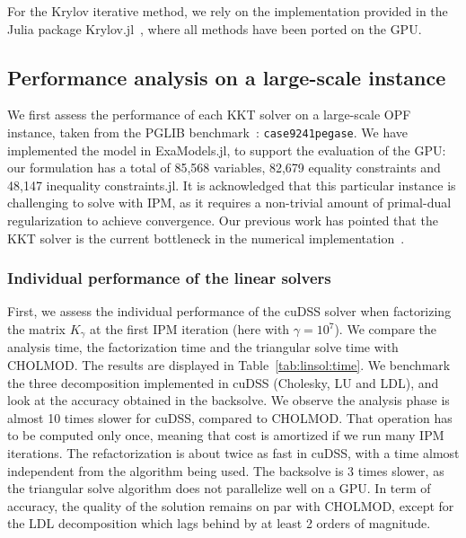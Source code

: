 For the Krylov iterative method, we rely on the implementation
provided in the Julia package Krylov.jl~\cite{montoison2023krylov},
where all methods have been ported on the GPU.


\subsection{Performance analysis on a large-scale instance}
We first assess the performance of each KKT solver
on a large-scale OPF instance, taken from
the PGLIB benchmark~\cite{babaeinejadsarookolaee2019power}: {\tt case9241pegase}.
We have implemented the model in ExaModels.jl, to support
the evaluation of the GPU: our formulation has
a total of 85,568 variables, 82,679 equality constraints and 48,147
inequality constraints.jl.
It is acknowledged that this particular instance is challenging to solve
with IPM, as it requires a non-trivial amount of primal-dual regularization
to achieve convergence.
Our previous work has pointed that the KKT solver is the current bottleneck
in the numerical implementation~\cite{shin2023accelerating}.

\subsubsection{Individual performance of the linear solvers}
First, we assess the individual performance of the cuDSS solver when factorizing
the matrix $K_\gamma$ at the first IPM iteration (here with $\gamma = 10^7$).
We compare the analysis
time, the factorization time and the triangular solve time with CHOLMOD.
The results are displayed in Table~\ref{tab:linsol:time}. We benchmark the
three decomposition implemented in cuDSS (Cholesky, LU and LDL), and look at
the accuracy obtained in the backsolve. We observe the analysis phase
is almost 10 times slower for cuDSS, compared to CHOLMOD. That operation
has to be computed only once, meaning that cost is amortized if we run
many IPM iterations. The refactorization is about twice as fast in cuDSS,
with a time almost independent from the algorithm being used. The backsolve
is 3 times slower, as the triangular solve algorithm does not parallelize
well on a GPU. In term of accuracy, the quality of the solution remains on
par with CHOLMOD, except for the LDL decomposition which lags behind by at least
2 orders of magnitude.


